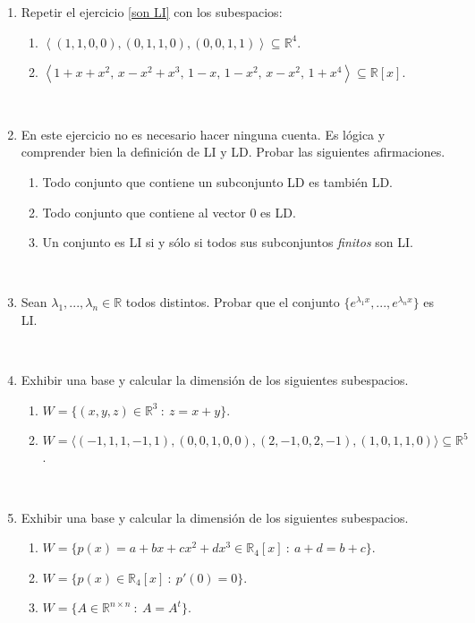 \documentclass[12pt]{amsart}
\begin{document}
\begin{enumerate}[resume]
\

\item  Repetir el ejercicio \eqref{son LI} con los subespacios:

\begin{enumerate}
	\item ${\left\langle(1,1,0,0),(0,1,1,0),(0,0,1,1)\right\rangle}\subseteq \mathbb{R}^4$.
	\item ${\left\langle 1+x+x^2,\, x-x^2+x^3,\, 1-x,\, 1-x^2,\, x-x^2,\, 1+x^4\right\rangle}\subseteq \mathbb{R}[x]$.
\end{enumerate}

\

\item En este ejercicio no es necesario hacer ninguna cuenta. Es l\'ogica y comprender bien la definici\'on de LI y LD. Probar las siguientes afirmaciones.
\begin{enumerate}
\item Todo conjunto que contiene un subconjunto LD es tambi\'en LD.
\item Todo conjunto que contiene al vector 0 es LD.
\item Un conjunto es LI si y s\'olo si todos sus subconjuntos \emph{finitos} son LI.
\end{enumerate}

\

\item Sean $\lambda_1, ..., \lambda_n\in\mathbb{R}$ todos distintos. Probar que el conjunto $\{e^{\lambda_1x}, ..., e^{\lambda_nx}\}$ es LI.

\

\item  Exhibir una base y calcular la dimensi\'on de los siguientes subespacios.

\begin{enumerate}
    \item $W=\{(x,y,z) \in \mathbb{R}^3 \ : \ z = x + y \}$.
	\item $W = \langle (-1, 1, 1, -1, 1),  (0, 0, 1, 0, 0), (2, -1, 0, 2, -1), (1, 0, 1, 1, 0) \rangle \subseteq \mathbb R^5$.
\end{enumerate}


\

\item Exhibir una base y calcular la dimensi\'on de los siguientes subespacios.
\begin{enumerate}
	\item $W = \{ p(x)=a+bx+cx^2+dx^3\in \mathbb{R}_{4}[x] \ : \ a+d=b+c \}$.
\item $W= \{ p(x)\in \mathbb{R}_{4}[x] \ : \ p'(0)=0 \}$.
	\item $W = \{A \in \mathbb{R}^{n\times n} \ : \ A = A^t\}$.
\end{enumerate}


\end{enumerate}
\end{document}
